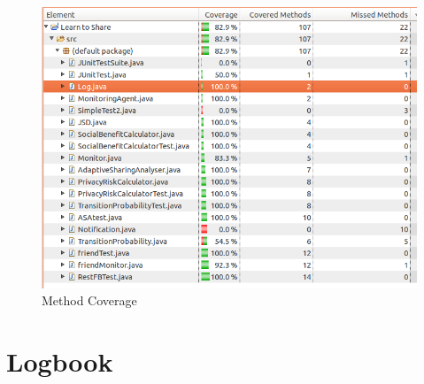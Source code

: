 \documentclass[a4paper,11pt]{article}
\begin{document}
\begin{figure}[H]
	\centering
	\includegraphics[scale=0.62]{APpendix/MethodCoverage}
	\caption{Method Coverage}
\end{figure}

\section{Logbook}
\end{document}

